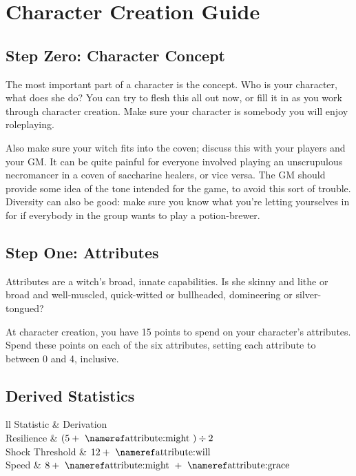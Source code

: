 \chapter{Character Creation Guide}

\section{Step Zero: Character Concept}

The most important part of a character is the concept.
Who is your character, what does she do?
You can try to flesh this all out now, or fill it in as you work through character creation.
Make sure your character is somebody you will enjoy roleplaying.

Also make sure your witch fits into the coven; discuss this with your players and your GM.
It can be quite painful for everyone involved playing an unscrupulous necromancer in a coven of saccharine healers, or vice versa.
The GM should provide some idea of the tone intended for the game, to avoid this sort of trouble.
Diversity can also be good: make sure you know what you're letting yourselves in for if everybody in the group wants to play a potion-brewer.

\section{Step One: Attributes}

Attributes are a witch's broad, innate capabilities.
Is she skinny and lithe or broad and well-muscled, quick-witted or bullheaded, domineering or silver-tongued?

At character creation, you have 15 points to spend on your character's attributes.
Spend these points on each of the six attributes, setting each attribute to between 0 and 4, inclusive.

\section{Derived Statistics}

\begin{simpletable}{ll}
	\toprule
	Statistic & Derivation\\
	\midrule
	Resilience & $(5 + \text{\attref{might}}) \div 2$\\
	Shock Threshold & $12 + \text{\attref{will}}$\\
	Speed & $8 + \text{\attref{might}} + \text{\attref{grace}}$\\
	\bottomrule
\end{simpletable}
